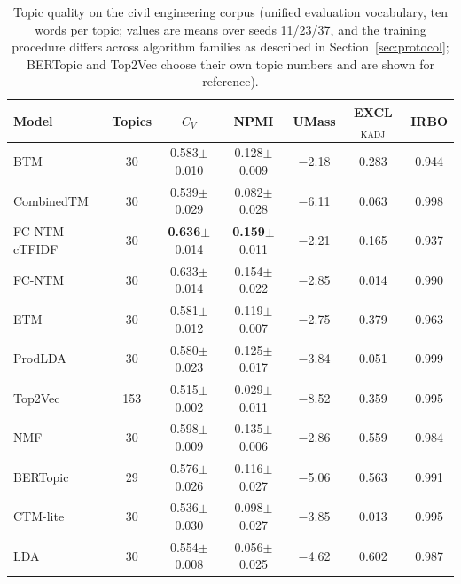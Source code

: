 \documentclass[11pt]{article}
\newcommand{\fcntm}{FC-NTM}
\begin{document}
 \begin{table}[t]
\centering
\caption{Topic quality on the civil engineering corpus (unified evaluation vocabulary, ten words per topic; values are means over seeds 11/23/37, and the training procedure differs across algorithm families as described in Section~\ref{sec:protocol}; BERTopic and Top2Vec choose their own topic numbers and are shown for reference).}
\label{tab:civil}
\small
\begin{tabular}{lcccccc}
\toprule
Model & Topics & $C_V$ & NPMI & UMass & EXCL$_{\mathrm{KADJ}}$ & IRBO \\
\midrule
BTM & 30 & 0.583$\pm$0.010 & 0.128$\pm$0.009 & $-$2.18 & 0.283 & 0.944 \\
CombinedTM & 30 & 0.539$\pm$0.029 & 0.082$\pm$0.028 & $-$6.11 & 0.063 & 0.998 \\
\fcntm{}-cTFIDF & 30 & \textbf{0.636}$\pm$0.014 & \textbf{0.159}$\pm$0.011 & $-$2.21 & 0.165 & 0.937 \\
\fcntm{} & 30 & 0.633$\pm$0.014 & 0.154$\pm$0.022 & $-$2.85 & 0.014 & 0.990 \\
ETM & 30 & 0.581$\pm$0.012 & 0.119$\pm$0.007 & $-$2.75 & 0.379 & 0.963 \\
ProdLDA & 30 & 0.580$\pm$0.023 & 0.125$\pm$0.017 & $-$3.84 & 0.051 & 0.999 \\
Top2Vec & 153 & 0.515$\pm$0.002 & 0.029$\pm$0.011 & $-$8.52 & 0.359 & 0.995 \\
NMF & 30 & 0.598$\pm$0.009 & 0.135$\pm$0.006 & $-$2.86 & 0.559 & 0.984 \\
BERTopic & 29 & 0.576$\pm$0.026 & 0.116$\pm$0.027 & $-$5.06 & 0.563 & 0.991 \\
CTM-lite & 30 & 0.536$\pm$0.030 & 0.098$\pm$0.027 & $-$3.85 & 0.013 & 0.995 \\
LDA & 30 & 0.554$\pm$0.008 & 0.056$\pm$0.025 & $-$4.62 & 0.602 & 0.987 \\
\bottomrule
\end{tabular}
\end{table}
\end{document}
